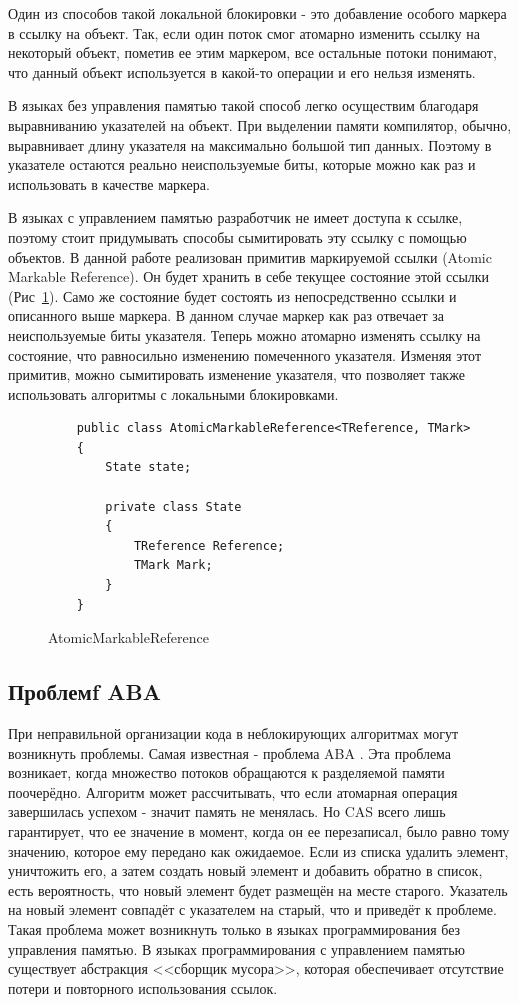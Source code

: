 \documentclass[12pt]{article}
\begin{document}
{				\par Один из способов такой локальной блокировки - это добавление особого маркера в ссылку на объект. Так, если один поток смог атомарно изменить ссылку на некоторый объект, пометив ее этим маркером, все остальные потоки понимают, что данный объект используется в какой-то операции и его нельзя изменять. 
				\par В языках без управления памятью такой способ легко осуществим благодаря выравниванию указателей на объект. При выделении памяти компилятор, обычно, выравнивает длину указателя на максимально большой тип данных. Поэтому в указателе остаются реально неиспользуемые биты, которые можно как раз и использовать в качестве маркера.
				\par В языках с управлением памятью разработчик не имеет доступа к ссылке, поэтому стоит придумывать способы сымитировать эту ссылку с помощью объектов. В данной работе реализован примитив маркируемой ссылки (Atomic Markable Reference). Он будет хранить в себе текущее состояние этой ссылки (Рис~\ref{pic:AMR}). Само же состояние будет состоять из непосредственно ссылки и описанного выше маркера. В данном случае маркер как раз отвечает за неиспользуемые биты указателя. Теперь можно атомарно изменять ссылку на состояние, что равносильно изменению помеченного указателя. Изменяя этот примитив, можно сымитировать изменение указателя, что позволяет также использовать алгоритмы с локальными блокировками. 		
				\begin{figure}[h]
					\begin{lstlisting}
	public class AtomicMarkableReference<TReference, TMark>
	{
		State state;
		
		private class State
		{
			TReference Reference;
			TMark Mark;
		}
	}
					\end{lstlisting}
					\caption{AtomicMarkableReference}
					\label{pic:AMR}
				\end{figure}
			\subsection{Проблемf ABA}
				\par При неправильной организации кода в неблокирующих алгоритмах могут возникнуть проблемы. Самая известная - проблема ABA \cite{ABA}. Эта проблема возникает, когда множество потоков обращаются к разделяемой памяти поочерёдно. Алгоритм может рассчитывать, что если атомарная операция завершилась успехом - значит память не менялась. Но CAS всего лишь гарантирует, что ее значение в момент, когда он ее перезаписал, было равно тому значению, которое ему передано как ожидаемое. Если из списка удалить элемент, уничтожить его, а затем создать новый элемент и добавить обратно в список, есть вероятность, что новый элемент будет размещён на месте старого. Указатель на новый элемент совпадёт с указателем на старый, что и приведёт к проблеме. Такая проблема может возникнуть только в языках программирования без управления памятью. В языках программирования с управлением памятью существует абстракция <<сборщик мусора>>, которая обеспечивает отсутствие потери и повторного использования ссылок.
}
\end{document}
